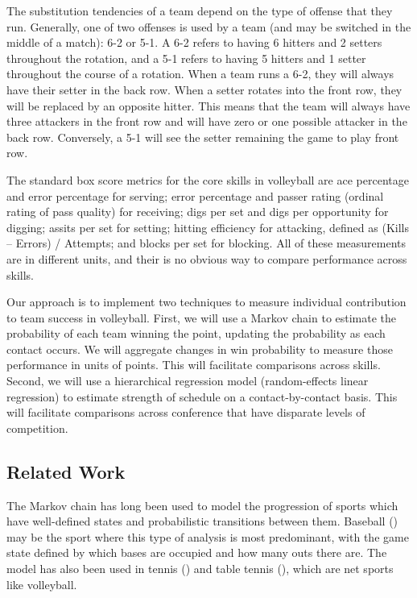 \documentclass[USenglish]{article}
\theoremstyle{dgthm}
\theoremstyle{dgdef}
\begin{document}
The substitution tendencies of a team depend on the type of offense that they run. Generally, one of two offenses is used by a team (and may be switched in the middle of a match): 6-2 or 5-1. A 6-2 refers to having 6 hitters and 2 setters throughout the rotation, and a 5-1 refers to having 5 hitters and 1 setter throughout the course of a rotation. When a team runs a 6-2, they will always have their setter in the back row. When a setter rotates into the front row, they will be replaced by an opposite hitter. This means that the team will always have three attackers in the front row and will have zero or one possible attacker in the back row. Conversely, a 5-1 will see the setter remaining the game to play front row.

The standard box score metrics for the core skills in volleyball are ace percentage and error percentage for serving; error percentage and passer rating (ordinal rating of pass quality) for receiving; digs per set and digs per opportunity for digging; assits per set for setting; hitting efficiency for attacking, defined as (Kills -- Errors) / Attempts; and blocks per set for blocking. All of these measurements are in different units, and their is no obvious way to compare performance across skills.

Our approach is to implement two techniques to measure individual contribution to team success in volleyball. First, we will use a Markov chain to estimate the probability of each team winning the point, updating the probability as each contact occurs. We will aggregate changes in win probability to measure those performance in units of points. This will facilitate comparisons across skills. Second, we will use a hierarchical regression model (random-effects linear regression) to estimate strength of schedule on a contact-by-contact basis. This will facilitate comparisons across conference that have disparate levels of competition.


\subsection{Related Work}
\label{sec:related-work}

The Markov chain has long been used to model the progression of sports which have well-defined states and probabilistic transitions between them. Baseball (\cite{bukiet_etal_1997}) may be the sport where this type of analysis is most predominant, with the game state defined by which bases are occupied and how many outs there are. The model has also been used in tennis (\cite{newton_etal_2009}) and table tennis (\cite{pfeiffer_etal_2010}), which are net sports like volleyball.
\end{document}
